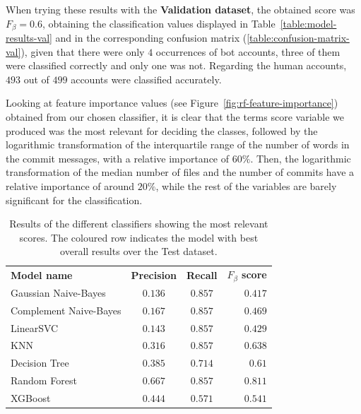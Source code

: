 \documentclass[a4paper, 12pt]{book}
\begin{document}
\newpage
When trying these results with the \textbf{Validation dataset}, the obtained score was \textbf{$F_{\beta} = 0.6$}, obtaining the classification values displayed in Table~\ref{table:model-results-val} and in the corresponding confusion matrix (\ref{table:confusion-matrix-val}), given that there were only $4$ occurrences of bot accounts, three of them were classified correctly and only one was not. Regarding the human accounts, $493$ out of $499$ accounts were classified accurately.

Looking at feature importance values (see Figure~\ref{fig:rf-feature-importance}) obtained from our chosen classifier, it is clear that the terms score variable we produced was the most relevant for deciding the classes, followed by the logarithmic transformation of the interquartile range of the number of words in the commit messages, with a relative importance of $60\%$. Then, the logarithmic transformation of the median number of files and the number of commits have a relative importance of around $20\%$, while the rest of the variables are barely significant for the classification.

\begin{table}[tb]
\renewcommand{\arraystretch}{1.5}
\begin{center}
\begin{tabular}{ l c c r }
  \toprule
  \textbf{Model name}    &  \textbf{Precision}  & \textbf{Recall}   &    \textbf{$F_{\beta}$ score} \\
      Gaussian Naive-Bayes   & $0.136$  & $ 0.857$  &    $0.417$   \\ 
      Complement Naive-Bayes & $0.167$  &  $0.857$  &    $0.469$   \\  
      LinearSVC              & $0.143$  & $0.857$  &   $0.429$   \\ 
      KNN                    & $0.316$  &  $0.857$  &    $0.638$   \\ 
      Decision Tree          & $0.385$  &  $0.714$  &    $0.61$    \\  
      \rowcolor[HTML]{67FD9A} 
      Random Forest          & $0.667$  &  $0.857$  &    $0.811$   \\  
      XGBoost                & $0.444$  &  $0.571$  &    $0.541$   \\ 
  \bottomrule
\end{tabular}
\caption{Results of the different classifiers showing the most relevant scores. The coloured row indicates the model with best overall results over the Test dataset.}
\label{table:model-results}
\end{center}
\end{table}
\end{document}
